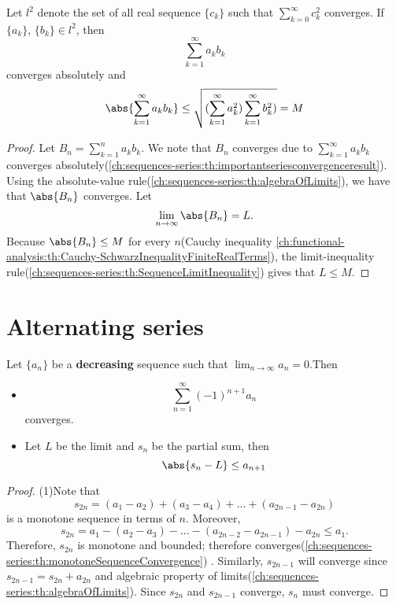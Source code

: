 \begin{refsection}
\begin{theorem}\cite[123]{johnsonbaugh2010foundations}
Let $l^2$ denote the set of all real sequence $\{c_k\}$ such that $\sum_{k=0}^\infty c_k^2$ converges. If $\{a_k\}$, $\{b_k\} \in l^2$, then $$\sum_{k=1}^\infty a_kb_k$$
converges absolutely and 
	$$\abs{\sum_{k=1}^\infty a_kb_k} \leq \sqrt{(\sum_{k=1}^\infty a_k^2)\sum_{k=1}^\infty b_k^2)} = M$$
\end{theorem}
\begin{proof}
Let $B_n =\sum_{k=1}^n a_kb_k$. We note that $B_n$ converges due to $\sum_{k=1}^\infty a_kb_k$ converges absolutely(\autoref{ch:sequences-series:th:importantseriesconvergenceresult}). Using the absolute-value rule(\autoref{ch:sequences-series:th:algebraOfLimits}), we have that $\abs{B_n}$ converges. Let $$\lim_{n \rightarrow \infty} \abs{B_n} = L.$$
Because $\abs{B_n} \leq M$ for every $n$(Cauchy inequality \autoref{ch:functional-analysis:th:Cauchy-SchwarzInequalityFiniteRealTerms}), the limit-inequality rule(\autoref{ch:sequences-series:th:SequenceLimitInequality}) gives that $L\leq M$. 
\end{proof}


\section{Alternating series}

\begin{theorem}\cite[25]{johnsonbaugh2010foundations} Let $\{a_n\}$ be a \textbf{decreasing} sequence such that $\lim_{n\to \infty } a_n = 0$.Then 
\begin{itemize}
	\item $$\sum_{n=1}^{\infty}(-1)^{n+1} a_n$$
	converges.
	\item Let $L$ be the limit and $s_n$ be the partial sum, then
	$$\abs{s_n - L} \leq a_{n+1}$$
\end{itemize}	
\end{theorem}
\begin{proof}
(1)Note that 
$$s_{2n} = (a_1-a_2) + (a_3-a_4) + ... + (a_{2n-1}-a_{2n})$$
is a monotone sequence in terms of $n$. Moreover, 
$$s_{2n} = a_1 - (a_2-a_3) - ... - (a_{2n-2}-a_{2n-1}) - a_{2n} \leq a_1.$$
Therefore, $s_{2n}$ is monotone and bounded; therefore converges(\autoref{ch:sequences-series:th:monotoneSequenceConvergence}) .
Similarly, $s_{2n-1}$ will converge since $s_{2n-1} = s_{2n}+a_{2n}$ and algebraic property of limits(\autoref{ch:sequences-series:th:algebraOfLimits}).
Since $s_{2n}$ and $s_{2n-1}$ converge, $s_n$ must converge.


\end{proof}
\end{refsection}
